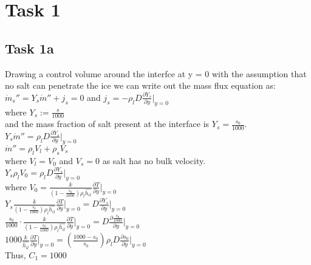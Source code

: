 \documentclass[letterpaper, 10pt]{article}
\begin{document}
	
	\section*{Task 1} %
	\label{sec:Task 1}
	
	\subsection*{Task 1a} %
	\label{ssec:Task 1a}
	Drawing a control volume around the interfce at y = 0 with the assumption that no salt can penetrate the ice we can write out the mass flux equation as:\\ 
	$\dot{m}_s'' = Y_s \dot{m}'' + j_s = 0$ and $j_s = -\rho_l D \frac{\partial Y_s}{\partial y}\big|_{y=0}$\\ 
	where $Y_s := \frac{s}{1000}$\\ 
	and the mass fraction of salt present at the interface is $Y_s = \frac{s_0}{1000}$.\\
		
	\noindent $Y_s \dot{m}'' = \rho_l D \frac{\partial Y_s}{\partial y}\big|_{y=0}$\\
	\noindent $\dot{m}'' = \rho_l V_l + \rho_s V_s$\\
	where $V_l = V_0$ and $V_s = 0$ as salt has no bulk velocity.\\
	
	\noindent $Y_s \rho_l V_0 = \rho_l D \frac{\partial Y_s}{\partial y}\big|_{y=0}$\\
	
	\noindent where $V_0 = \frac{k}{\left(1-\frac{s_0}{1000}\right)\rho_l \hat{h_{il}}} \frac{\partial T}{\partial y}\big|_{y=0}$\\
	
	\noindent $Y_s  \frac{k}{\left(1-\frac{s_0}{1000}\right)\rho_l \hat{h_{il}}} \frac{\partial T}{\partial y}\big|_{y=0} = D  \frac{\partial Y_s}{\partial y}\big|_{y=0}$\\
	
	\noindent $\frac{s_0}{1000} \cdot \frac{k}{\left(1-\frac{s_0}{1000}\right)\rho_l \hat{h_{il}}} \frac{\partial T}{\partial y}\big|_{y=0} = D  \frac{\partial \frac{s_0}{1000} }{\partial y}\big|_{y=0}$\\
	
	\noindent $1000 \frac{k}{\hat{h_{il}}} \frac{\partial T}{\partial y}\big|_{y=0} = \left(\frac{1000-s_0}{s_0}\right) \rho_l D \frac{\partial s_0}{\partial y}\big|_{y=0} $\\
	
	Thus, $C_1 = 1000 $\\
	
\end{document}
